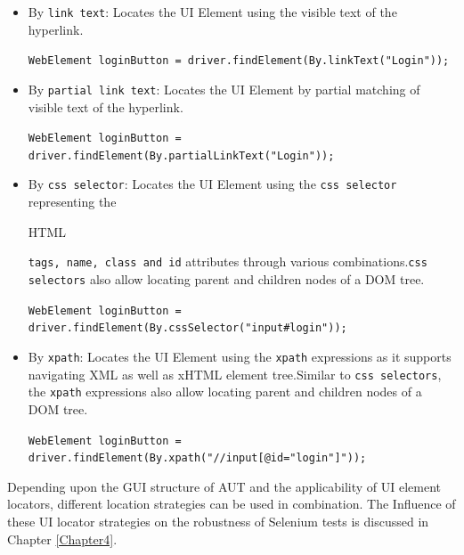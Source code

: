 \begin{itemize}
\item 
By \texttt{link text}:
Locates the UI Element using the visible text of the hyperlink.
\newline
\begin{footnotesize}
\texttt{WebElement loginButton = driver.findElement(By.linkText("Login"));
}
\end{footnotesize}

\item 
By \texttt{partial link text}:
Locates the UI Element by partial matching of visible text of the hyperlink.
\newline
\begin{footnotesize}
\texttt{WebElement loginButton = driver.findElement(By.partialLinkText("Login"));
}
\end{footnotesize}
\item 
By \texttt{css selector}:
Locates the UI Element using the \texttt{css selector} representing the \begin{footnotesize} HTML\end{footnotesize} \texttt{tags, name, class and id} attributes through various combinations.\texttt{css selectors} also allow locating parent and children nodes of a DOM tree. 
\newline
\begin{footnotesize}
\texttt{WebElement loginButton = driver.findElement(By.cssSelector("input\#login"));
}
\end{footnotesize}
\item 
By \texttt{xpath}:
Locates the UI Element using the \texttt{xpath} expressions as it supports navigating XML as well as xHTML element tree.Similar to \texttt{css selectors}, the \texttt{xpath} expressions also allow locating parent and children nodes of a DOM tree. 
\newline
\begin{footnotesize}
\texttt{WebElement loginButton = driver.findElement(By.xpath("//input[@id="login"]"));
}
\end{footnotesize}
\end{itemize}
Depending upon the GUI structure of AUT and the applicability of UI element locators, different location strategies can be used in combination. The Influence of these UI locator strategies on the robustness of Selenium tests is discussed in Chapter \ref{Chapter4}.

